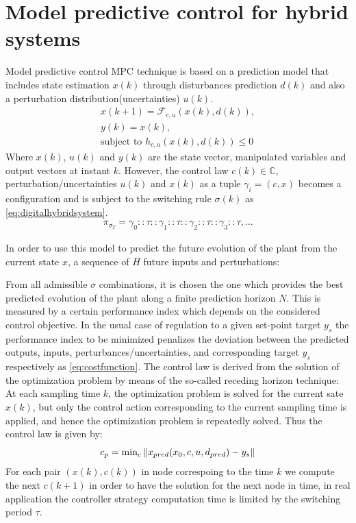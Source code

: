 \clearpage

\section{Model predictive control for hybrid systems}
\label{sec:modelpredictivecontroller}
    Model predictive control \ac{MPC} technique is based on a prediction model 
    that includes state estimation $x(k)$ through disturbances prediction $d(k)$
    and also a perturbation distribution(uncertainties) $u(k)$.
    \begin{gather*} 
      x(k+1) = \mathcal{F}_{c,u}(x(k),d(k)), \\
      y(k) = x(k), \\
      \text{subject to    } h_{c,u}(x(k), d(k)) \leqslant 0
    \end{gather*}
    Where $x(k)$, $u(k)$ and $y(k)$ are the state vector, manipulated variables
    and output vectors at instant  $k$. However, the 
    control law $c(k) \in \mathbb{C}$, perturbation/uncertainties 
    $u(k)$ and $x(k)$ as a tuple $\gamma_i=(c, x)$
     becomes a configuration and is subject to the switching rule $\sigma(k)$ 
     as \autoref{eq:digitalhybridsystem}. 
    \begin{gather*} 
      \pi_{\sigma_T} = \gamma_0::\tau::\gamma_1::\tau::\gamma_2::\tau::\gamma_3::\tau, ...
    \end{gather*}
    
    In order to use this model to 
     predict the future evolution of the plant from the current state 
     $x$, a sequence of $H$ future inputs and perturbations: 

    From all admissible $\sigma$ combinations, it is chosen the one which
    provides the best predicted evolution of the plant along a finite 
    prediction horizon $N$. This is measured by a certain performance index
    which depends on the considered control objective. In the usual case 
    of regulation to a given set-point target $y_s$ the performance index 
    to be minimized penalizes the deviation between the predicted outputs,
    inputs, perturbances/uncertainties, and corresponding target $y_s$ 
    respectively as \autoref{eq:costfunction}. The control law is derived from the solution of the optimization problem 
    by means of the so-called receding horizon technique: At each sampling time
    $k$, the optimization problem is solved for the current sate $x(k)$,
    but only the control action corresponding to the current sampling time is 
    applied, and hence the optimization problem is repeatedly solved. Thus the 
    control law is given by:
    \begin{equation} 
      \label{eq:costfunction}
      c_p = \text{min}_c \left\lVert x_{pred}(x_0,c,u,d_{pred})-y_s\right\rVert
    \end{equation}
    For each pair $(x(k),c(k))$ in node correspoing to the time $k$ we compute
    the next $c(k+1)$ in order to have the solution for the next node in time, 
    in real application the controller strategy computation time 
    is limited by the switching period $\tau$.
    \clearpage

